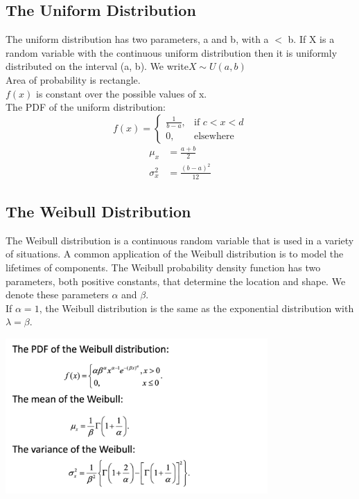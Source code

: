 \documentclass[../main.tex]{subfiles}
\begin{document}
\subsection{The Uniform Distribution}
The uniform distribution has two parameters, a and b, with a $<$ b. If X is a random variable with the continuous uniform distribution then it is uniformly distributed on the interval (a, b). We write$X\sim U(a,b)$\\
Area of probability is rectangle.\\
$f(x)$ is constant over the possible values of x.\\
The PDF of the uniform distribution:
\begin{equation*}
    f(x)=
    \begin{cases}
    \frac{1}{b-a}, & \mbox{if } c< x < d\\
    0, & \mbox{elsewhere}
    \end{cases}
\end{equation*}
\begin{align*}
    \mu _x &= \frac{a+b}{2}\\
    \sigma _x ^2 &= \frac{(b-a)^2}{12}
\end{align*}
\subsection{The Weibull Distribution}
The Weibull distribution is a continuous random variable that is used in a variety of situations. A common application of the Weibull distribution is to model the lifetimes of components. The Weibull probability density function has two parameters, both positive constants, that determine the location and shape. We denote these parameters $\alpha$ and $\beta$.\\
If $\alpha = 1$, the Weibull distribution is the same as the exponential distribution with $\lambda = \beta$.

\includegraphics[width = 10cm]{Sections/Image/Weibull.png}\\
\end{document}
